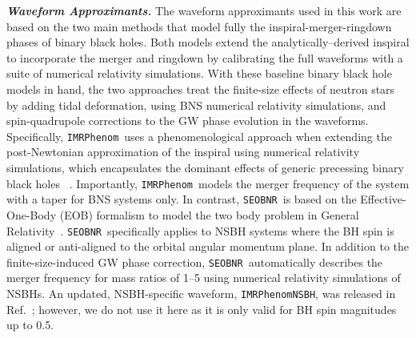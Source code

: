 \documentclass[%
 reprint,
 superscriptaddress,
 nofootinbib,
 amsmath,amssymb,
 aps,
]{revtex4-2}
\newcommand{\seobnr}{\texttt{SEOBNR}}
\newcommand{\imrp}{\texttt{IMRPhenom}}
\begin{document}
\textbf{\emph{Waveform Approximants.}} The waveform approximants used in this work are based on the two main methods that model fully the inspiral-merger-ringdown phases of binary black holes. Both models extend the analytically--derived inspiral to incorporate the merger and ringdown by calibrating the full waveforms with a suite of numerical relativity simulations. With these baseline binary black hole models in hand, the two approaches treat the finite-size effects of neutron stars by adding tidal deformation, using BNS numerical relativity simulations, and spin-quadrupole corrections to the GW phase evolution in the waveforms. Specifically, \imrp\ uses a phenomenological approach when extending the post-Newtonian approximation of the inspiral using numerical relativity simulations, which encapsulates the dominant effects of generic precessing binary black holes ~\cite[e.g.,][]{Ajith_etal:2007,*Ajith_etal:2008,*Hannametal:2014}. Importantly, \imrp\ models the merger frequency of the system with a taper for BNS systems only. In contrast, \seobnr\ is based on the Effective-One-Body (EOB) formalism to model the two body problem in General Relativity~\cite[e.g.,][]{Buonanno_Damour:1999, *Buonanno_Damour:2000, *Bohe_etal:2017, *Barausse_Buonanno:2010}. \seobnr\ specifically applies to NSBH systems where the BH spin is aligned or anti-aligned to the orbital angular momentum plane. In addition to the finite-size-induced GW phase correction, \seobnr\ automatically describes the merger frequency for mass ratios of 1--5 using numerical relativity simulations of NSBHs. An updated, NSBH-specific waveform, \texttt{IMRPhenomNSBH}, was released in Ref.~\cite{Thompson_etal:2020}; however, we do not use it here as it is only valid for BH spin magnitudes up to 0.5.
\end{document}
